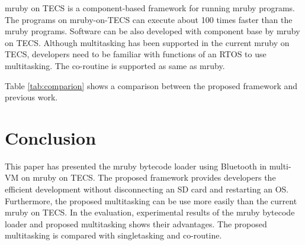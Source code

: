 \documentclass[conference,compsoc]{IEEEtran}
\begin{document}
mruby on TECS is a component-based framework for running mruby programs.
The programs on mruby-on-TECS can execute about 100 times faster than the mruby programs.
Software can be also developed with component base by mruby on TECS.
Although multitasking has been supported in the current mruby on TECS, developers need to be familiar with functions of an RTOS to use multitasking.
The co-routine is supported as same as mruby.

Table \ref{tab:comparion} shows a comparison between the proposed framework and previous work.

\section{Conclusion}
\label{sec:Conclusion}
This paper has presented the mruby bytecode loader using Bluetooth in multi-VM on mruby on TECS.
The proposed framework provides developers the efficient development without disconnecting an SD card and restarting an OS.
Furthermore, the proposed multitasking can be use more easily than the current mruby on TECS.
In the evaluation, experimental results of the mruby bytecode loader and proposed multitasking shows their advantages.
The proposed multitasking is compared with singletasking and co-routine.



\end{document}
